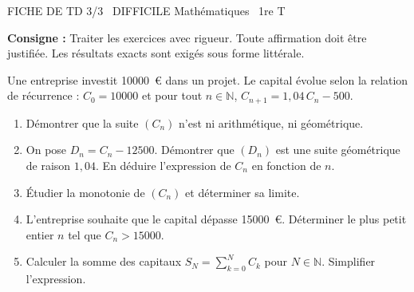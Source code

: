 \documentclass[11pt]{article}
\begin{document}
\begin{tcolorbox}[enhanced,colback=popink,colframe=popink,arc=10pt,boxrule=0pt,left=12pt,right=12pt,top=9pt,bottom=9pt]
{\color{white}\popxbold\small FICHE DE TD 3/3 \textbullet\ DIFFICILE \hfill Mathématiques \textbullet\ 1re T\par}
\end{tcolorbox}
\vspace{4pt}
\noindent \textbf{Consigne :} Traiter les exercices avec rigueur. Toute affirmation doit être justifiée. Les résultats exacts sont exigés sous forme littérale.

\begin{exercice}
Une entreprise investit \SI{10000}{\euro} dans un projet. Le capital évolue selon la relation de récurrence : $C_0 = 10000$ et pour tout $n \in \mathbb{N}$, $C_{n+1} = 1,04\, C_n - 500$.
\begin{enumerate}
    \item Démontrer que la suite $(C_n)$ n'est ni arithmétique, ni géométrique.
    \item On pose $D_n = C_n - 12500$. Démontrer que $(D_n)$ est une suite géométrique de raison $1,04$. En déduire l'expression de $C_n$ en fonction de $n$.
    \item Étudier la monotonie de $(C_n)$ et déterminer sa limite.
    \item L'entreprise souhaite que le capital dépasse \SI{15000}{\euro}. Déterminer le plus petit entier $n$ tel que $C_n > 15000$.
    \item Calculer la somme des capitaux $S_N = \sum_{k=0}^{N} C_k$ pour $N \in \mathbb{N}$. Simplifier l'expression.
\end{enumerate}
\end{exercice}
\end{document}
